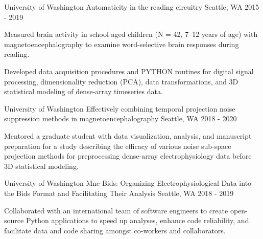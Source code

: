 

\begin{cventries}
  \cventry
    {University of Washington} %
    {Automaticity in the reading circuitry} %
    {Seattle, WA} %
    {2015 - 2019} %
    {
      \begin{cvitems} %
        \item {Measured brain activity in school-aged children (N = 42, 7–12 years of age) with magnetoencephalography to examine word-selective brain responses during reading.}
        \item {Developed data acquisition procedures and PYTHON routines for digital signal processing, dimensionality reduction (PCA), data transformations, and 3D statistical modeling of dense-array timeseries data.}
      \end{cvitems}
    }

  \cventry
    {University of Washington} %
    {Effectively combining temporal projection noise suppression methods in magnetoencephalography} %
    {Seattle, WA} %
    {2018 - 2020} %
    {
      \begin{cvitems} %
        \item {Mentored a graduate student with data visualization, analysis, and manuscript preparation for a study describing the efficacy of various noise sub-space projection methods for preprocessing dense-array electrophysiology data before 3D statistical modeling.}
      \end{cvitems}
    }

  \cventry
    {University of Washington} %
    {Mne-Bids: Organizing Electrophysiological Data into the Bids Format and Facilitating Their Analysis} %
    {Seattle, WA} %
    {2018 - 2019} %
    {
      \begin{cvitems} %
        \item {Collaborated with an international team of software engineers to create open-source Python applications to speed up analyses, enhance code reliability, and facilitate data and code sharing amongst co-workers and collaborators.}
      \end{cvitems}
    }


\end{cventries}
